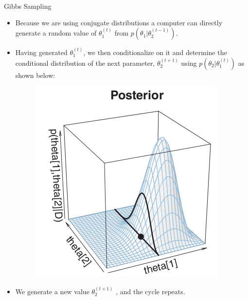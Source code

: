 \documentclass[handout]{beamer}
\begin{document}
\begin{frame}{Gibbs Sampling}
\scriptsize{


\begin{itemize}

\item Because we are using conjugate distributions a computer can directly generate a random  value of $\theta_1^{(t)}$ from $p(\theta_1|\theta_2^{(t-1)})$.

\item Having generated $\theta_1^{(t)}$, we then conditionalize on it and determine the conditional distribution of the next parameter, $\theta_2^{(t+1)}$ using $p(\theta_2|\theta_1^{(t)})$  as shown below:

 \begin{figure}[h!]
	\centering
	\includegraphics[scale=0.4]{pics/gibbs2.png}
	\end{figure} 

\item We generate a new value $\theta_2^{(t+1)}$ , and the cycle repeats.



\end{itemize}


} 
\end{frame}
\end{document}
